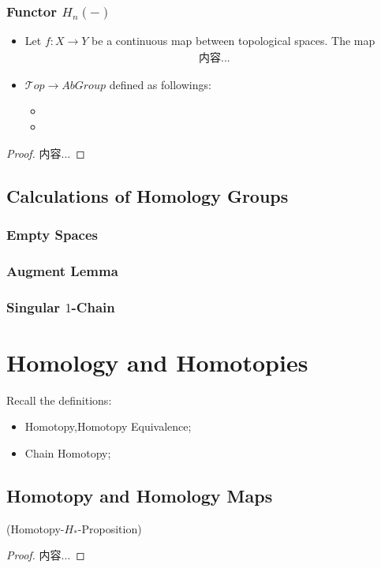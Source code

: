 \documentclass[Total.tex]{subfiles}
\begin{document}
			\subsubsection{Functor $H_n(-)$}
			\begin{lemma}
				\begin{itemize}
					\item Let $f:X\rightarrow Y$ be a continuous map between topological spaces. The map
					\begin{gather*}
						内容...
					\end{gather*}
					\item $\mathcal Top\rightarrow AbGroup$ defined as followings: 
					\begin{itemize}
						\item 
						\item 
					\end{itemize}
				\end{itemize}
			\end{lemma}
			\begin{proof}
				内容...
			\end{proof}
			\subsection{Calculations of Homology Groups}
				\subsubsection{Empty Spaces}
				\subsubsection{Augment Lemma}
				\subsubsection{Singular $1$-Chain}
		\section{Homology and Homotopies}
			Recall the definitions:
			\begin{itemize}
				\item Homotopy,Homotopy Equivalence;
				\item Chain Homotopy;
			\end{itemize}
			\subsection{Homotopy and Homology Maps} 
			\begin{proposition}
				(Homotopy-$H_*$-Proposition)
			\end{proposition}
			\begin{proof}
				内容...
			\end{proof}
			
\end{document}
